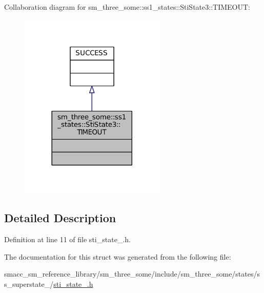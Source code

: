 Collaboration diagram for sm\+\_\+three\+\_\+some\+:\+:ss1\+\_\+states\+:\+:Sti\+State3\+:\+:T\+I\+M\+E\+O\+UT\+:
\nopagebreak
\begin{figure}[H]
\begin{center}
\leavevmode
\includegraphics[width=197pt]{structsm__three__some_1_1ss1__states_1_1StiState3_1_1TIMEOUT__coll__graph}
\end{center}
\end{figure}


\subsection{Detailed Description}


Definition at line 11 of file sti\+\_\+state\+\_.\+h.



The documentation for this struct was generated from the following file\+:\begin{DoxyCompactItemize}
\item 
smacc\+\_\+sm\+\_\+reference\+\_\+library/sm\+\_\+three\+\_\+some/include/sm\+\_\+three\+\_\+some/states/ss\+\_\+superstate\+\_/\hyperlink{sti__state__3_8h}{sti\+\_\+state\+\_.\+h}\end{DoxyCompactItemize}
